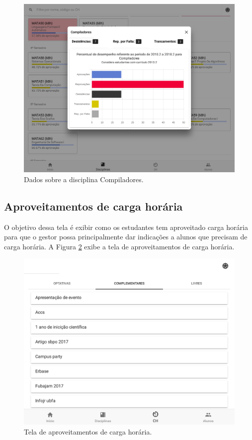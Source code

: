 \begin{figure}[H]
	   \centering
	   		\includegraphics[scale=0.15]{pics/c3/16-compiladores.png}
	   \caption{Dados sobre a disciplina Compiladores.}
	   \label{discipline-chart}
\end{figure}

\subsection{Aproveitamentos de carga horária}

O objetivo dessa tela é exibir como os estudantes tem aproveitado carga horária para que o gestor possa principalmente dar indicações a alunos que precisam de carga horária. A Figura \ref{pacch} exibe a tela de aproveitamentos de carga horária.

\begin{figure}[H]
	   \centering
	   		\includegraphics[scale=0.25]{pics/c3/17-ch.png}
	   \caption{Tela de aproveitamentos de carga horária.}
	   \label{pacch}
\end{figure}

